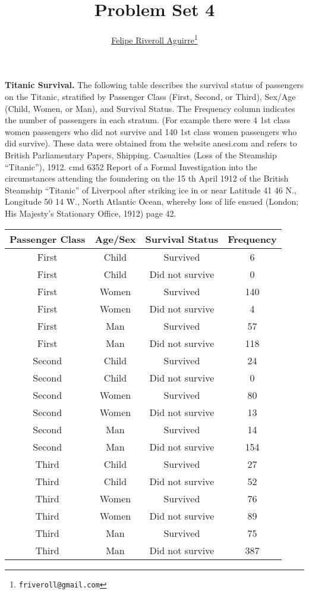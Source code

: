 \documentclass{article}
\begin{document}


\title{Problem Set 4}
\author{\href{http://feliperiveroll.name}{Felipe Riveroll Aguirre}\footnote{\texttt{friveroll@gmail.com}}} 
\maketitle

\textbf{Titanic Survival.} The following table describes the survival status of passengers on the Titanic, stratified by Passenger Class (First, Second, or Third), Sex/Age (Child, Women, or Man), and Survival Status. The Frequency column indicates the number of passengers in each stratum. (For example there were 4 1st class women passengers who did not survive and 140 1st class women passengers who did survive). These data were obtained from the website anesi.com and refers to British Parliamentary Papers, Shipping. Casualties (Loss of the Steamship ``Titanic''), 1912. cmd 6352 Report of a Formal Investigation into the circumstances attending the foundering on the 15 th April 1912 of the British Steamship ``Titanic'' of Liverpool after striking ice in or near Latitude 41 46 N., Longitude 50 14 W., North Atlantic Ocean, whereby loss of life ensued (London; His Majesty's Stationary Office, 1912) page 42.\\

\begin{table*}[hp]
\begin{center}
\begin{tabular}{cccc}
  \hline
 Passenger Class & Age/Sex & Survival Status & Frequency \\ 
  \hline
First & Child & Survived &   6 \\ 
First & Child & Did not survive &   0 \\ 
First & Women & Survived & 140 \\ 
First & Women & Did not survive &   4 \\ 
First & Man & Survived &  57 \\ 
First & Man & Did not survive & 118 \\ 
Second & Child & Survived &  24 \\ 
Second & Child & Did not survive &   0 \\ 
Second & Women & Survived &  80 \\ 
Second & Women & Did not survive &  13 \\ 
Second & Man & Survived &  14 \\ 
Second & Man & Did not survive & 154 \\ 
Third & Child & Survived &  27 \\ 
Third & Child & Did not survive &  52 \\ 
Third & Women & Survived &  76 \\ 
Third & Women & Did not survive &  89 \\ 
Third & Man & Survived &  75 \\ 
Third & Man & Did not survive & 387 \\ 
   \hline
\end{tabular}
\end{center}
\end{table*}
\end{document}
